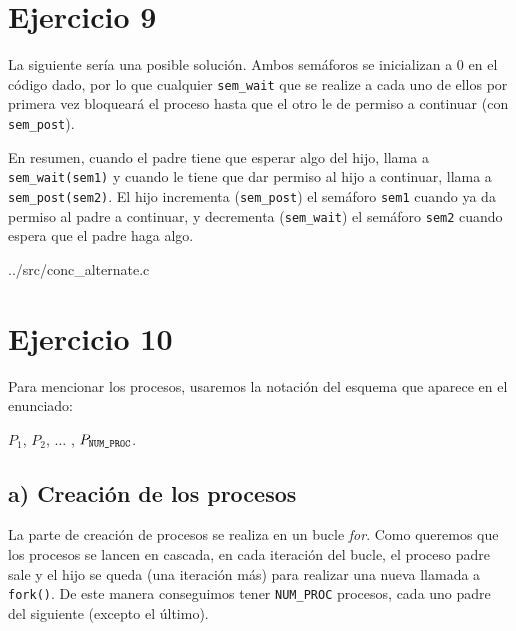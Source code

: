 \documentclass{article}
\begin{document}
\section*{Ejercicio 9}
La siguiente sería una posible solución. Ambos semáforos se inicializan a $0$ en el código dado, por lo que cualquier \texttt{sem\_wait} que se realize a cada uno de ellos por primera vez bloqueará el proceso hasta que el otro le de permiso a continuar (con \texttt{sem\_post}).

En resumen, cuando el padre tiene que esperar algo del hijo, llama a \texttt{sem\_wait(sem1)} y cuando le tiene que dar permiso al hijo a continuar, llama a \texttt{sem\_post(sem2)}. El hijo incrementa (\texttt{sem\_post}) el semáforo \texttt{sem1} cuando ya da permiso al padre a continuar, y decrementa (\texttt{sem\_wait}) el semáforo \texttt{sem2} cuando espera que el padre haga algo.


{../src/conc_alternate.c}


\pagebreak

\section*{Ejercicio 10}

Para mencionar los procesos, usaremos la notación del esquema que aparece en el enunciado: 

\noindent$P_1$, $P_2$, $\dots$ , $P_\texttt{\scriptsize{NUM\_PROC}}$.

\subsection*{a) Creación de los procesos} 

La parte de creación de procesos se realiza en un bucle \textit{for}. Como queremos que los procesos se lancen en cascada, en cada iteración del bucle, el proceso padre sale y el hijo se queda (una iteración más) para realizar una nueva llamada a \texttt{fork()}. De este manera conseguimos tener \texttt{NUM\_PROC} procesos, cada uno padre del siguiente (excepto el último).
\end{document}
